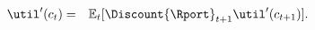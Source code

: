   \begin{eqnarray}
    \util^{\prime}({c}_{t}) & = & \Ex_{t}[\Discount {\Rport}_{t+1} \util^{\prime}({c}_{t+1})]. \label{eq:EulercRiskyR}
  \end{eqnarray}
